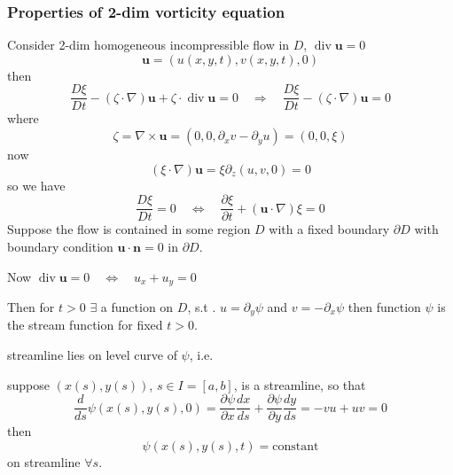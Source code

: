 \subsubsection{Properties of 2-dim vorticity equation} %

Consider 2-dim homogeneous incompressible flow in $D$, $\operatorname{div}\textbf{u} = 0$
\begin{equation}
\textbf{u} = (u(x,y,t), v(x,y,t), 0)
\end{equation}
then
\begin{equation}
\frac{D\xi}{Dt} - \left(\zeta\cdot\nabla\right)\textbf{u} + \zeta \cdot \operatorname{div} \textbf{u} = 0
\quad\Rightarrow\quad
\frac{D\xi}{Dt} - \left(\zeta\cdot\nabla\right)\textbf{u} = 0
\end{equation}
where
\begin{equation}
\zeta = \nabla \times \textbf{u} = (0,0,\partial_x v - \partial_y u) = (0,0,\xi)
\end{equation}
now 
\begin{equation}
\left(\xi\cdot\nabla\right)\textbf{u} = \xi\partial_{z}(u,v,0) = 0
\end{equation}
so we have
\begin{equation}
\frac{D\xi}{Dt} = 0
\quad\Leftrightarrow\quad
\frac{\partial \xi}{\partial t} + (\textbf{u}\cdot \nabla)\xi = 0
\end{equation}
Suppose the flow is contained in some region $D$ with a fixed boundary $\partial D$ with boundary condition $\textbf{u}\cdot\textbf{n} = 0$ in $\partial D$.

Now $\operatorname{div} \textbf{u} = 0 \quad\Leftrightarrow\quad u_x + u_y = 0$

Then for $t>0$ $\exists$ a function on $D$, s.t . $u=\partial_y \psi$ and $v = -\partial_x \psi$ then function $\psi$ is the stream function for fixed $t>0$.



streamline lies on level curve of $\psi$​, i.e. 

suppose $(x(s),y(s))$, $s\in I=[a,b]$, is a streamline, so that
\begin{equation}
\frac{d}{ds}\psi(x(s),y(s),0) = \frac{\partial \psi}{\partial x} \frac{dx}{ds} + \frac{\partial \psi}{\partial y} \frac{dy}{ds} = -vu + uv = 0
\end{equation}
then
\begin{equation}
\psi(x(s),y(s),t) = \text{constant}
\end{equation}
on streamline $\forall s$.

